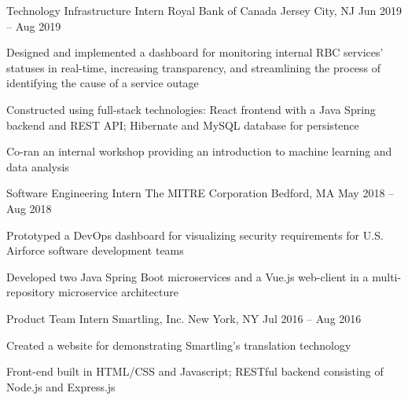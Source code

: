 

\begin{cventries}

  \cventry
  {Technology Infrastructure Intern}
  {Royal Bank of Canada}
  {Jersey City, NJ}
  {Jun 2019 -- Aug 2019}
  {
    \begin{cvitems}
      \item {Designed and implemented a dashboard for monitoring internal RBC services' statuses in real-time, increasing transparency, and streamlining the process of identifying the cause of a service outage}
      \item {Constructed using full-stack technologies: React frontend with a Java Spring backend and REST API; Hibernate and MySQL database for persistence}
      \item {Co-ran an internal workshop providing an introduction to machine learning and data analysis}
    \end{cvitems}
  }


  \cventry
  {Software Engineering Intern}
  {The MITRE Corporation}
  {Bedford, MA}
  {May 2018 -- Aug 2018}
  {
    \begin{cvitems}
      \item {Prototyped a DevOps dashboard for visualizing security requirements for U.S. Airforce software development teams}
      \item {Developed two Java Spring Boot microservices and a Vue.js web-client in a multi-repository microservice architecture}
    \end{cvitems}
  }


  \cventry
  {Product Team Intern}
  {Smartling, Inc.}
  {New York, NY}
  {Jul 2016 -- Aug 2016}
  {
    \begin{cvitems}
      \item Created a website for demonstrating Smartling's translation technology
      \item Front-end built in HTML/CSS and Javascript; RESTful backend consisting of Node.js and Express.js
    \end{cvitems}
  }


\end{cventries}